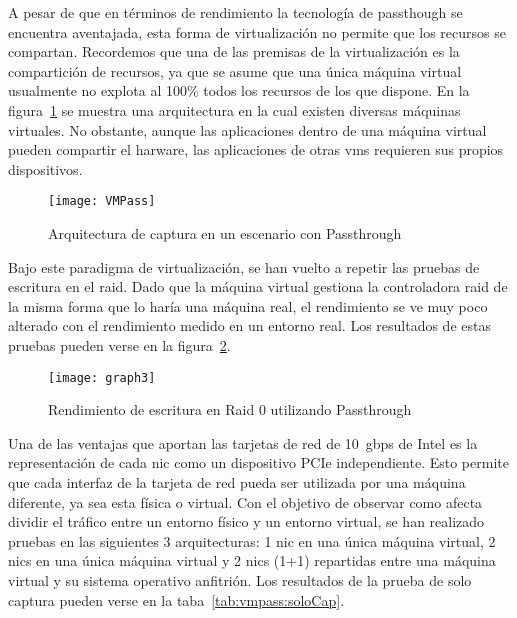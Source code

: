 A pesar de que en términos de rendimiento la tecnología de \gls{passthough} se encuentra aventajada, esta forma de virtualización no permite que los recursos se compartan. Recordemos que una de las premisas de la virtualización es la compartición de recursos, ya que se asume que una única máquina virtual usualmente no explota al 100\% todos los recursos de los que dispone. En la figura~\ref{fig:vmpass} se muestra una arquitectura en la cual existen diversas máquinas virtuales. No obstante, aunque las aplicaciones dentro de una máquina virtual pueden compartir el harware, las aplicaciones de otras \glspl{vm} requieren sus propios dispositivos.

\begin{figure}[!htb]
\centering
\texttt{[image: VMPass]}
\caption{Arquitectura de captura en un escenario con Passthrough} 
\label{fig:vmpass}
\end{figure}

Bajo este paradigma de virtualización, se han vuelto a repetir las pruebas de escritura en el raid. Dado que la máquina virtual gestiona la controladora raid de la misma forma que lo haría una máquina real, el rendimiento se ve muy poco alterado con el rendimiento medido en un entorno real. Los resultados de estas pruebas pueden verse en la figura~\ref{fig:vmfisica:graphdd3}.

\begin{figure}[!htb]
\centering
\texttt{[image: graph3]}
\caption{Rendimiento de escritura en Raid 0 utilizando Passthrough}
\label{fig:vmfisica:graphdd3}
\end{figure}

Una de las ventajas que aportan las tarjetas de red de 10~\gls{gbps} de Intel es la representación de cada \gls{nic} como un dispositivo PCIe independiente. Esto permite que cada interfaz de la tarjeta de red pueda ser utilizada por una máquina diferente, ya sea esta física o virtual. Con el objetivo de observar como afecta dividir el tráfico entre un entorno físico y un entorno virtual, se han realizado pruebas en las siguientes 3 arquitecturas: 1 \gls{nic} en una única máquina virtual, 2 \glspl{nic} en una única máquina virtual y 2 \glspl{nic} (1+1) repartidas entre una máquina virtual y su sistema operativo anfitrión. Los resultados de la prueba de solo captura pueden verse en la taba~\ref{tab:vmpass:soloCap}.

